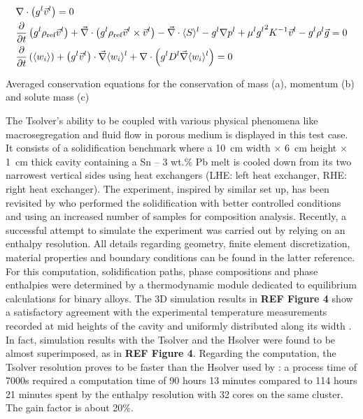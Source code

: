 \begin{table}[h]
\centering
\begin{subequations}
\begin{align}
& \nabla \cdot \left( {g^l} \vec{v}^l \right)  = 0 \\ 
& \frac{\partial}{\partial t} \left( {g^l} \rho_{\text{ref}} \vec{v}^l \right)  + \vec{\nabla} \cdot \left( {g^l} \rho_{\text{ref}} \vec{v}^l \times \vec{v}^l \right) - \vec{\nabla}\cdot\langle S \rangle^l -{g^l}
   \nabla p^l +\mu^l {g^l}^2 K^{-1} \vec{v}^l -{g^l}\rho^l \vec{g} = 0 \\
& \frac{\partial}{\partial t} \left( \langle w_i \rangle \right)  + \left( {g^l} \vec{v}^l \right) \cdot \vec{\nabla} \langle w_i \rangle^l + \nabla \cdot \left( {g^l} D^l \vec{\nabla} \langle w_i \rangle^l  \right) = 0
\end{align}
\end{subequations}
\caption{Averaged conservation equations for the conservation of mass (a), momentum (b) and solute mass (c)}
\label{table:smacs_equations}
\end{table}

The Tsolver’s ability to be coupled with various physical phenomena like macrosegregation and fluid flow 
in porous medium is displayed in this test case. It consists of a solidification benchmark where a \SI{10}{\centi \metre}
width × \SI{6}{\centi \metre} height × \SI{1}{\centi \metre} thick cavity containing a Sn – 3 wt.\% Pb melt is cooled down from its two 
narrowest vertical sides using heat exchangers (LHE: left heat exchanger, RHE: right heat exchanger). The 
experiment, inspired by \citet{hebditch_observations_1974} similar set up, has been 
revisited by \citet{hachani_experimental_2012} who performed the solidification with better 
controlled conditions and using an increased number of samples for composition analysis. Recently, a successful 
attempt to simulate the experiment was carried out by \citet{carozzani_direct_2013} relying on an enthalpy resolution. 
All details regarding geometry, finite element discretization, material properties 
and boundary conditions can be found in the latter reference. 
For this computation, solidification paths, phase compositions and phase enthalpies were determined by a thermodynamic 
module dedicated to equilibrium calculations for binary alloys. The 3D simulation results in \textbf{REF Figure 4} show 
a satisfactory agreement with the experimental temperature measurements recorded at mid heights of the cavity and uniformly 
distributed along its width \citep{carozzani_direct_2013}. In fact, simulation results with the Tsolver and the Hsolver were 
found to be almost superimposed, as in \textbf{REF Figure 4}. Regarding the computation, the Tsolver resolution proves to be 
faster than the Hsolver used by \citet{carozzani_direct_2013}: a process time of 7000s required a computation time of 90 hours 
13 minutes compared to 114 hours 21 minutes spent by the enthalpy resolution with 32 cores on the same cluster. The gain factor 
is about 20\%.
